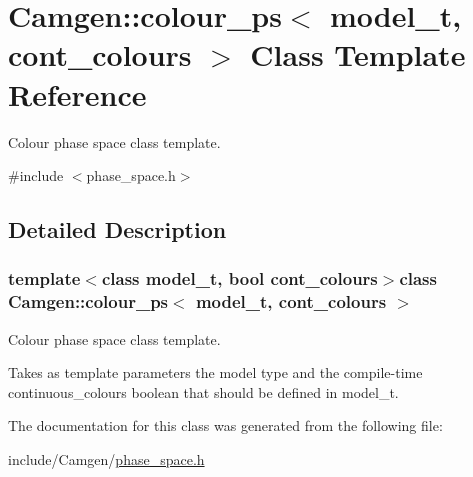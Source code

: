 \hypertarget{a00089}{\section{Camgen\-:\-:colour\-\_\-ps$<$ model\-\_\-t, cont\-\_\-colours $>$ Class Template Reference}
\label{a00089}
}


Colour phase space class template.  




{\ttfamily \#include $<$phase\-\_\-space.\-h$>$}



\subsection{Detailed Description}
\subsubsection*{template$<$class model\-\_\-t, bool cont\-\_\-colours$>$class Camgen\-::colour\-\_\-ps$<$ model\-\_\-t, cont\-\_\-colours $>$}

Colour phase space class template. 

Takes as template parameters the model type and the compile-\/time continuous\-\_\-colours boolean that should be defined in model\-\_\-t. 

The documentation for this class was generated from the following file\-:\begin{DoxyCompactItemize}
\item 
include/\-Camgen/\hyperlink{a00694}{phase\-\_\-space.\-h}\end{DoxyCompactItemize}
